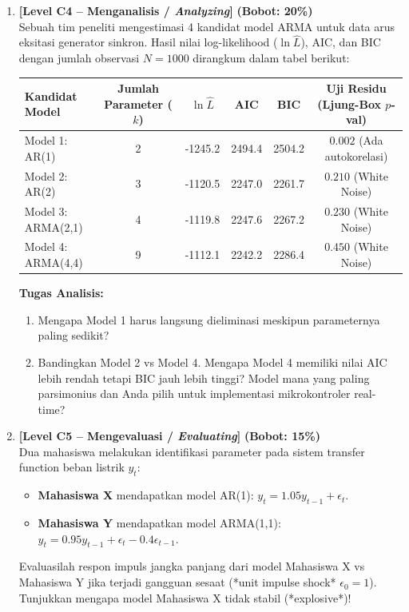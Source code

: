 \documentclass[11pt,a4paper]{article}
\begin{document}
\begin{enumerate}[leftmargin=1.5em, label=\textbf{Soal \arabic*.}]
    \newpage

    \item \textbf{[Level C4 -- Menganalisis / \textit{Analyzing}]} \hfill \textbf{(Bobot: 20\%)} \\
    Sebuah tim peneliti mengestimasi 4 kandidat model ARMA untuk data arus eksitasi generator sinkron. Hasil nilai log-likelihood ($\ln \hat{L}$), AIC, dan BIC dengan jumlah observasi $N=1000$ dirangkum dalam tabel berikut:
    \begin{center}
    \begin{tabular}{|l|c|c|c|c|c|}
    \hline
    \rowcolor{boxbg}
    \textbf{Kandidat Model} & \textbf{Jumlah Parameter ($k$)} & $\ln \hat{L}$ & \textbf{AIC} & \textbf{BIC} & \textbf{Uji Residu (Ljung-Box $p$-val)} \\ \hline
    Model 1: AR(1) & 2 & -1245.2 & 2494.4 & 2504.2 & $0.002$ (Ada autokorelasi) \\ \hline
    Model 2: AR(2) & 3 & -1120.5 & 2247.0 & 2261.7 & $0.210$ (White Noise) \\ \hline
    Model 3: ARMA(2,1) & 4 & -1119.8 & 2247.6 & 2267.2 & $0.230$ (White Noise) \\ \hline
    Model 4: ARMA(4,4) & 9 & -1112.1 & 2242.2 & 2286.4 & $0.450$ (White Noise) \\ \hline
    \end{tabular}
    \end{center}
    \textbf{Tugas Analisis:}
    \begin{enumerate}[label=\alph*.]
        \item Mengapa Model 1 harus langsung dieliminasi meskipun parameternya paling sedikit?
        \item Bandingkan Model 2 vs Model 4. Mengapa Model 4 memiliki nilai AIC lebih rendah tetapi BIC jauh lebih tinggi? Model mana yang paling parsimonius dan Anda pilih untuk implementasi mikrokontroler real-time?
    \end{enumerate}

    \vspace{0.4cm}

    \item \textbf{[Level C5 -- Mengevaluasi / \textit{Evaluating}]} \hfill \textbf{(Bobot: 15\%)} \\
    Dua mahasiswa melakukan identifikasi parameter pada sistem transfer function beban listrik $y_t$:
    \begin{itemize}
        \item \textbf{Mahasiswa X} mendapatkan model AR(1): $y_t = 1.05 y_{t-1} + \epsilon_t$.
        \item \textbf{Mahasiswa Y} mendapatkan model ARMA(1,1): $y_t = 0.95 y_{t-1} + \epsilon_t - 0.4 \epsilon_{t-1}$.
    \end{itemize}
    Evaluasilah respon impuls jangka panjang dari model Mahasiswa X vs Mahasiswa Y jika terjadi gangguan sesaat (*unit impulse shock* $\epsilon_0 = 1$). Tunjukkan mengapa model Mahasiswa X tidak stabil (*explosive*)!


\end{enumerate}
\end{document}
